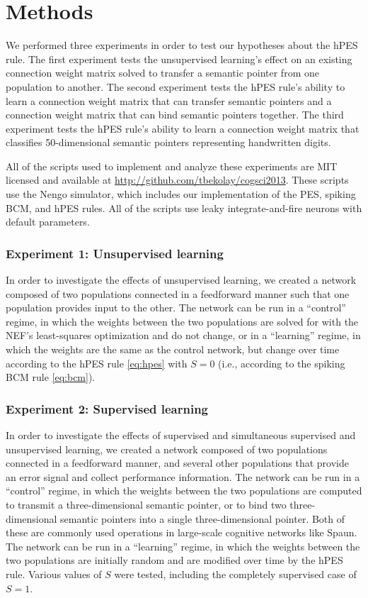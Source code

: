 \documentclass[10pt,letterpaper]{article}
\begin{document}
\section{Methods}

We performed three experiments in order to
test our hypotheses about the hPES rule.
The first experiment tests the unsupervised learning's
effect on an existing connection weight matrix
solved to transfer a semantic pointer
from one population to another.
The second experiment tests the hPES rule's
ability to learn a connection weight matrix
that can transfer semantic pointers
and a connection weight matrix
that can bind semantic pointers together.
The third experiment tests the hPES
rule's ability to learn a connection weight matrix
that classifies 50-dimensional semantic pointers
representing handwritten digits.

All of the scripts used to implement
and analyze these experiments
are MIT licensed and available at
\url{http://github.com/tbekolay/cogsci2013}.
These scripts use the Nengo simulator,
which includes our implementation
of the PES, spiking BCM, and hPES rules.
All of the scripts use leaky integrate-and-fire
neurons with default parameters.

\subsubsection{Experiment 1: Unsupervised learning}

In order to investigate the effects
of unsupervised learning,
we created a network composed of two populations
connected in a feedforward manner
such that one population provides input to the other.
The network can be run in a ``control'' regime,
in which the weights between the two populations
are solved for with the NEF's least-squares optimization
and do not change, or in a ``learning'' regime,
in which the weights are the same as the control network,
but change over time according to the hPES rule \eqref{eq:hpes}
with $S = 0$ (i.e., according to the spiking BCM rule \eqref{eq:bcm}).

\subsubsection{Experiment 2: Supervised learning}

In order to investigate the effects
of supervised and
simultaneous supervised and unsupervised learning,
we created a network composed of two populations
connected in a feedforward manner,
and several other populations that provide
an error signal and collect performance information.
The network can be run in a ``control'' regime,
in which the weights between the two populations
are computed to transmit a three-dimensional semantic pointer,
or to bind two three-dimensional semantic pointers
into a single three-dimensional pointer.
Both of these are commonly used operations
in large-scale cognitive networks like Spaun.
The network can be run in a ``learning'' regime,
in which the weights between the two populations
are initially random
and are modified over time by the hPES rule.
Various values of $S$ were tested,
including the completely supervised case of $S = 1$.
\end{document}
